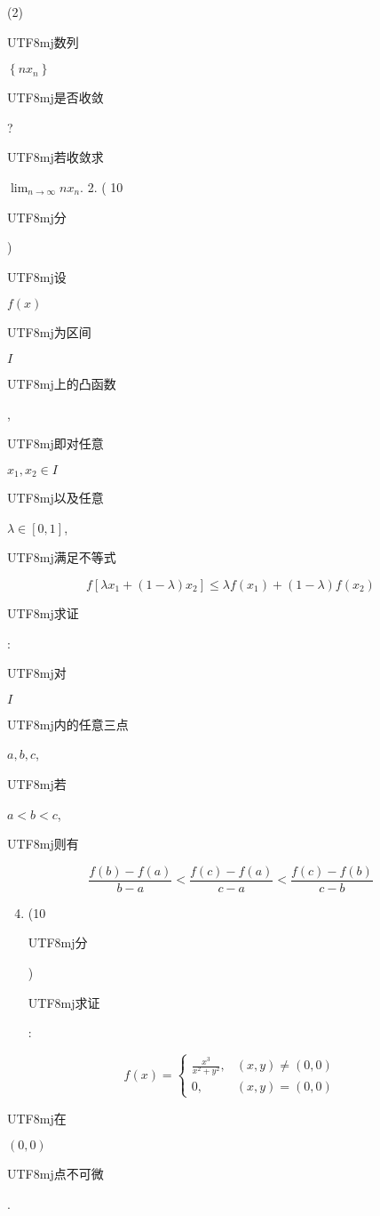 \documentclass[10pt]{article}
\begin{document}
(2) \begin{CJK}{UTF8}{mj}数列\end{CJK} $\left\{n x_{n}\right\}$ \begin{CJK}{UTF8}{mj}是否收敛\end{CJK}? \begin{CJK}{UTF8}{mj}若收敛求\end{CJK} $\lim _{n \rightarrow \infty} n x_{n}$. 2. ( 10 \begin{CJK}{UTF8}{mj}分\end{CJK}) \begin{CJK}{UTF8}{mj}设\end{CJK} $f(x)$ \begin{CJK}{UTF8}{mj}为区间\end{CJK} $I$ \begin{CJK}{UTF8}{mj}上的凸函数\end{CJK}, \begin{CJK}{UTF8}{mj}即对任意\end{CJK} $x_{1}, x_{2} \in I$ \begin{CJK}{UTF8}{mj}以及任意\end{CJK} $\lambda \in[0,1]$, \begin{CJK}{UTF8}{mj}满足不等式\end{CJK}
$$
f\left[\lambda x_{1}+(1-\lambda) x_{2}\right] \leqslant \lambda f\left(x_{1}\right)+(1-\lambda) f\left(x_{2}\right)
$$
\begin{CJK}{UTF8}{mj}求证\end{CJK}: \begin{CJK}{UTF8}{mj}对\end{CJK} $I$ \begin{CJK}{UTF8}{mj}内的任意三点\end{CJK} $a, b, c$, \begin{CJK}{UTF8}{mj}若\end{CJK} $a<b<c$, \begin{CJK}{UTF8}{mj}则有\end{CJK}
$$
\frac{f(b)-f(a)}{b-a}<\frac{f(c)-f(a)}{c-a}<\frac{f(c)-f(b)}{c-b}
$$

\begin{enumerate}
  \setcounter{enumi}{3}
  \item (10 \begin{CJK}{UTF8}{mj}分\end{CJK}) \begin{CJK}{UTF8}{mj}求证\end{CJK}:
\end{enumerate}
$$
f(x)= \begin{cases}\frac{x^{3}}{x^{2}+y^{2}}, & (x, y) \neq(0,0) \\ 0, & (x, y)=(0,0)\end{cases}
$$
\begin{CJK}{UTF8}{mj}在\end{CJK} $(0,0)$ \begin{CJK}{UTF8}{mj}点不可微\end{CJK}.
\end{document}
